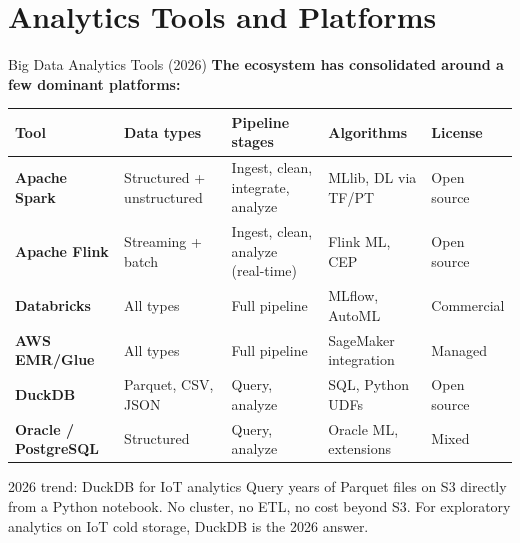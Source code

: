 \documentclass[aspectratio=169,11pt]{beamer}
\begin{document}
\section{Analytics Tools and Platforms}

\begin{frame}{Big Data Analytics Tools (2026)}
    \small
    \textbf{The ecosystem has consolidated around a few dominant platforms:}

    \vspace{0.05cm}
    \begin{center}
    \scriptsize
    \begin{tabular}{p{2.3cm}p{2.5cm}p{2.5cm}p{2.5cm}p{1.8cm}}
        \toprule
        \textbf{Tool} & \textbf{Data types} & \textbf{Pipeline stages} & \textbf{Algorithms} & \textbf{License} \\
        \midrule
        \textbf{Apache Spark} & Structured + unstructured & Ingest, clean, integrate, analyze & MLlib, DL via TF/PT & Open source \\
        \textbf{Apache Flink} & Streaming + batch & Ingest, clean, analyze (real-time) & Flink ML, CEP & Open source \\
        \textbf{Databricks} & All types & Full pipeline & MLflow, AutoML & Commercial \\
        \textbf{AWS EMR/Glue} & All types & Full pipeline & SageMaker integration & Managed \\
        \textbf{DuckDB} & Parquet, CSV, JSON & Query, analyze & SQL, Python UDFs & Open source \\
        \textbf{Oracle / PostgreSQL} & Structured & Query, analyze & Oracle ML, extensions & Mixed \\
        \bottomrule
    \end{tabular}
    \end{center}

    \begin{exampleblock}{2026 trend: DuckDB for IoT analytics}
        Query years of Parquet files on S3 directly from a Python notebook. No cluster, no ETL, no cost beyond S3. For exploratory analytics on IoT cold storage, DuckDB is the 2026 answer.
    \end{exampleblock}
\end{frame}
\end{document}
